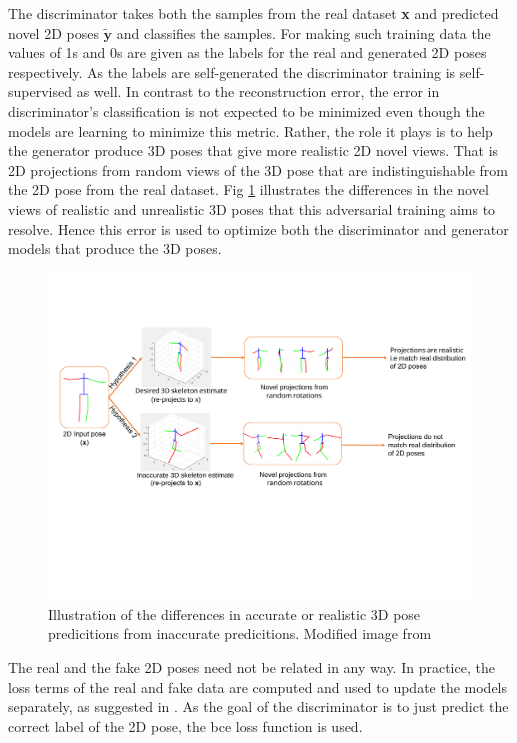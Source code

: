 The discriminator takes both the samples from the real dataset \textbf{x} and predicted novel 2D poses $\tilde{\textbf{y}}$ and classifies the samples. For making such training data the values of 1s and 0s are given as the labels for the real and generated 2D poses respectively. As the labels are self-generated the discriminator training is self-supervised as well. In contrast to the reconstruction error, the error in discriminator's classification is not expected to be minimized even though the models are learning to minimize this metric. Rather, the role it plays is to help the generator produce 3D poses that give more realistic 2D novel views. That is 2D projections from random views of the 3D pose that are indistinguishable from the 2D pose from the real dataset. Fig \ref{fig:novel_view_constraint} illustrates the differences in the novel views of realistic and unrealistic 3D poses that this adversarial training aims to resolve. Hence this error is used to optimize both the discriminator and generator models that produce the 3D poses.

\begin{figure}[h]
    \centering
    \includegraphics[width=\textwidth]{figures/h36_viz/novel_view_contraint.pdf}
    \caption{Illustration of the differences in accurate or realistic 3D pose predicitions from inaccurate predicitions. Modified image from \cite{can3dpose}}
    \label{fig:novel_view_constraint}
\end{figure}

The real and the fake 2D poses need not be related in any way. In practice, the loss terms of the real and fake data are computed and used to update the models separately, as suggested in \cite{soumith2017wasserstein, goodfellow2014generative}. As the goal of the discriminator is to just predict the correct label of the 2D pose, the \ac{bce} loss function is used. 

